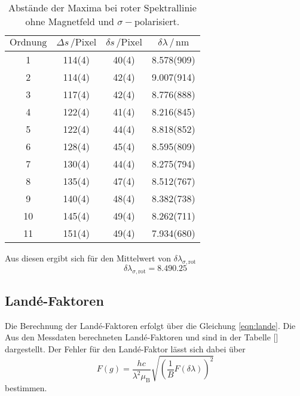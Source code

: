 \begin{table}
    \centering
    \caption{Abstände der Maxima bei roter Spektrallinie ohne Magnetfeld und $\sigma-$polarisiert.}
    \label{tab:maxima_rot_sigma}
    \begin{tabular}{S S S S}
        \toprule
        $\text{Ordnung}$ & $\Delta s \, /\text{Pixel}$  & $\delta s \, /\text{Pixel}$ & $\delta \lambda \, / \, \si{\nano\meter}$  \\
          & 114(4) & 40(4)  &  8.578(909) \\ 
        2  & 114(4) & 42(4)  &  9.007(914) \\
        3  & 117(4) & 42(4)  &  8.776(888) \\
        4  & 122(4) & 41(4)  &  8.216(845) \\
        5  & 122(4) & 44(4)  &  8.818(852) \\ 
        6  & 128(4) & 45(4)  &  8.595(809) \\
        7  & 130(4) & 44(4)  &  8.275(794) \\
        8  & 135(4) & 47(4)  &  8.512(767) \\
        9  & 140(4) & 48(4)  &  8.382(738) \\
        10 & 145(4) & 49(4)  &  8.262(711) \\
        11 & 151(4) & 49(4)  &  7.934(680) \\
        \bottomrule

    \end{tabular}
\end{table}

Aus diesen ergibt sich für den Mittelwert von $\delta\lambda_{\sigma,\text{rot}}$
\begin{equation}
    \delta\lambda_{\sigma,\text{rot}} = 8.49 0.25
\end{equation}

\subsection{Landé-Faktoren}

Die Berechnung der Landé-Faktoren erfolgt über die Gleichung \ref{eqn:lande}. Die Aus den Messdaten berechneten Landé-Faktoren und  
sind in der Tabelle [] dargestellt. Der Fehler für den Landé-Faktor lässt sich dabei über 
\begin{equation}
    F(g) = \frac{hc}{\lambda^2 \mu _\text{B}} \sqrt{\left ( \frac{1}{B} F(\delta \lambda) \right)^2}
\end{equation} bestimmen. 

